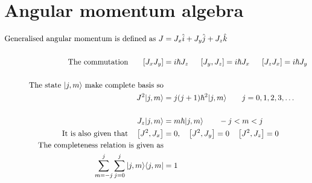 \section{Angular momentum algebra}
\begin{align*}
\text{Generalised angular momentum is defined as }J&=J_{x} \hat{i}+J_{y} \hat{j}+J_{z} \hat{k}\\\\
\text{The commutation \hspace{0.5cm}}\left[J_{x} J_{y}\right]&=i \hbar J_{z} \hspace{0.5cm} \left[J_{y}, J_{z}\right]=i \hbar J_{x}\hspace{0.5cm}\left[J_{z} J_{x}\right]=i \hbar J_{y}\\\\
\text{The state $|j, m\rangle$ make complete basis so}&\\
J^{2}|j, m\rangle&=j(j+1) \hbar^{2}|j, m\rangle \qquad j=0,1,2,3, \ldots \\\\
J_{z}|j, m\rangle&=m \hbar|j, m\rangle \qquad -j<m<j\\
\text{It is also given that}\quad\left[J^{2}, J_{x}\right]&=0,\quad \left[J^{2}, J_{y}\right]=0 \quad\left[J^{2}, J_{z}\right]=0\\
\text{The completeness relation is given as}\\
\sum_{m=-j}^{j} \sum_{j=0}^{j}|j, m\rangle\langle j, m|&=1
\end{align*}
